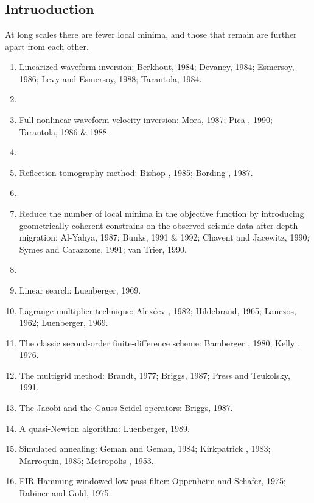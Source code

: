 \renewcommand{\pmk}{Bunks\_1995\_Geophy\_Multiscale waveform inversion}
\renewcommand{\prf}{FWI/\pmk.pdf}
\renewcommand{\pti}{Multiscale seismic waveform inversion}
\renewcommand{\pay}{Carey Bunks, Fatimetou M. Saleck, S. Zaleski,
  and G. Chavent, 1995}
\renewcommand{\pjo}{Geophysics}
\renewcommand{\pda}{2019/6/16 Sun.}

\section{\pinfo}

\subsection{Intruoduction}
At long scales there are fewer local minima, and those that remain
are further apart from each other.

\begin{enumerate}[\hspace{10mm}*]
  \item Linearized waveform inversion: Berkhout, 1984; Devaney, 1984;
    Esmersoy, 1986; Levy and Esmersoy, 1988; Tarantola, 1984.
  \item \sline
  \item Full nonlinear waveform velocity inversion: Mora, 1987;
    Pica \etal, 1990; Tarantola, 1986 \& 1988.
  \item \sline
  \item Reflection tomography method: Bishop \etal, 1985; Bording \etal, 1987.
  \item \sline
  \item Reduce the number of local minima in the objective function by
    introducing geometrically coherent constrains on the observed seismic
    data after depth migration: Al-Yahya, 1987; Bunks, 1991 \& 1992;
    Chavent and Jacewitz, 1990; Symes and Carazzone, 1991; van Trier, 1990.
  \item \sline
  \item Linear search: Luenberger, 1969.
  \item Lagrange multiplier technique: Alex\'eev \etal, 1982; Hildebrand, 1965;
    Lanczos, 1962; Luenberger, 1969.
  \item The classic second-order finite-difference scheme:
    Bamberger \etal, 1980; Kelly \etal, 1976.
  \item The multigrid method: Brandt, 1977; Briggs, 1987;
    Press and Teukolsky, 1991.
  \item The Jacobi and the Gauss-Seidel operators: Briggs, 1987.
  \item A quasi-Newton algorithm: Luenberger, 1989.
  \item Simulated annealing: Geman and Geman, 1984; Kirkpatrick \etal, 1983;
    Marroquin, 1985; Metropolis \etal, 1953.
  \item FIR Hamming windowed low-pass filter: Oppenheim and Schafer, 1975;
    Rabiner and Gold, 1975.
\end{enumerate}


